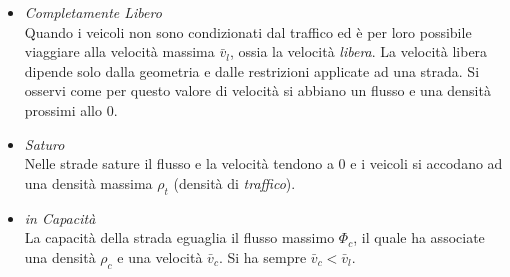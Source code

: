 \documentclass[../main.tex]{subfiles}
\begin{document}
\begin{itemize}
    \item \emph{Completamente Libero} 
        \\Quando i veicoli non sono condizionati dal traffico ed \`e per loro possibile viaggiare alla velocit\`a massima $\bar{v}_l$, ossia la velocit\`a \emph{libera}.
        La velocit\`a libera dipende solo dalla geometria e dalle restrizioni applicate ad una strada.
        Si osservi come per questo valore di velocit\`a si abbiano un flusso e una densit\`a prossimi allo $0$.
    \item \emph{Saturo}
        \\Nelle strade sature il flusso e la velocit\`a tendono a $0$ e i veicoli si accodano ad una densit\`a massima $\rho_t$ (densit\`a di \emph{traffico}).
    \item \emph{in Capacit\`a}
        \\La capacit\`a della strada eguaglia il flusso massimo $\Phi_c$, il quale ha associate una densit\`a $\rho_c$ e una velocit\`a $\bar{v}_c$.
        Si ha sempre $\bar{v}_c<\bar{v}_l$.
\end{itemize}
\end{document}
